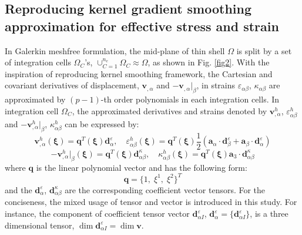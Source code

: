 \subsection{Reproducing kernel gradient smoothing approximation for effective stress and strain}
In Galerkin meshfree formulation, the mid-plane of thin shell $\Omega$ is split by a set of integration cells $\Omega_C$'s, $\cup_{C=1}^{n_e}\Omega_C\approx \Omega$, as shown in Fig. \ref{fig2}. With the inspiration of reproducing kernel smoothing framework, the Cartesian and covariant derivatives of displacement, $\boldsymbol v_{,\alpha}$ and $-\boldsymbol v_{,\alpha}\vert_\beta$, in strains $\varepsilon_{\alpha\beta}$, $\kappa_{\alpha\beta}$ are approximated by $(p-1)$-th order polynomials in each integration cells. In integration cell $\Omega_C$, the approximated derivatives and strains denoted by $\boldsymbol v^h_{,\alpha}$, $\varepsilon^h_{\alpha\beta}$ and $-\boldsymbol v^h_{,\alpha}\vert_\beta$, $\kappa^h_{\alpha\beta}$ can be expressed by:
\begin{equation}\label{approxsn1}
    \boldsymbol v^h_{,\alpha}(\boldsymbol \xi) = \boldsymbol q^T(\boldsymbol \xi) \boldsymbol d_{\alpha}^\varepsilon, \quad
    \varepsilon^h_{\alpha\beta}(\boldsymbol \xi) = \boldsymbol q^T(\boldsymbol \xi) \frac{1}{2}(\boldsymbol a_\alpha \cdot \boldsymbol d_{\beta}^\varepsilon + \boldsymbol a_\beta \cdot \boldsymbol d_{\alpha}^\varepsilon)
\end{equation}
\begin{equation}\label{approxsn2}
    -\boldsymbol v^h_{,\alpha}\vert_\beta(\boldsymbol \xi) = \boldsymbol q^T(\boldsymbol \xi) \boldsymbol d_{\alpha\beta}^\kappa , \quad
    \kappa^h_{\alpha\beta}(\boldsymbol \xi) = \boldsymbol q^T(\boldsymbol \xi) \boldsymbol a_3 \cdot \boldsymbol d_{\alpha\beta}^\kappa
\end{equation}
where $\boldsymbol q$ is the linear polynomial vector and has the following form:
\begin{equation}
\boldsymbol q = \{ 1,\; \xi^1,\; \xi^2\}^T
\end{equation}
and the $\boldsymbol d^\varepsilon_{\alpha}$, $\boldsymbol d^\kappa_{\alpha\beta}$ are the corresponding coefficient vector tensors. For the conciseness, the mixed usage of tensor and vector is introduced in this study. For instance, the component of coefficient tensor vector $\boldsymbol d^\varepsilon_{\alpha I}$, $\boldsymbol d^\varepsilon_\alpha = \{\boldsymbol d^\varepsilon_{\alpha I}\}$, is a three dimensional tensor, $\dim \boldsymbol d^\varepsilon_{\alpha I} = \dim \boldsymbol v$.

